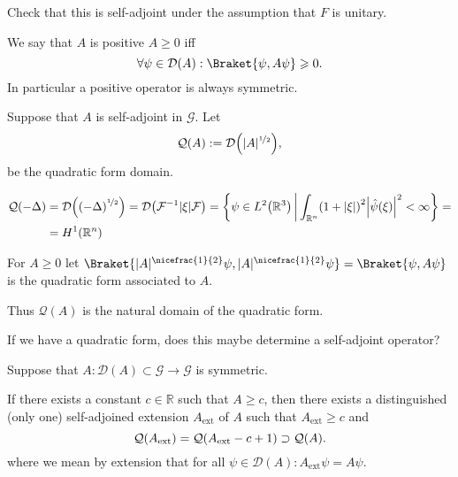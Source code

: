 \documentclass[12pt]{article}
\numberwithin{equation}{section}
\theoremstyle{plain}
\theoremstyle{plain}
\begin{document}
Check that this is self-adjoint under the assumption that $F$ is unitary.

\begin{defn}[Positivity]
	We say that $A$ is positive $A \geqslant 0$ iff
	\[
		\forall \psi \in \mathcal D(A) : \Braket{\psi, A \psi} \geqslant 0.	
	\] 
	In particular a positive operator is always symmetric.
\end{defn}


\begin{defn}
	Suppose that $A$ is self-adjoint in $\mathcal G$. Let 
	\[
		\mathcal Q(A) := \mathcal D \mleft( |A|^{\nicefrac{1}{2}} \mright),	
	\]
	be the quadratic form domain.
\end{defn}

\begin{example*}
	\begin{align*}
		\mathcal Q (-\Delta) &= \mathcal D \mleft( \mleft(-\Delta \mright)^{\nicefrac{1}{2}} \mright) = \mathcal D \mleft( \mathcal F^{-1} |\xi| \mathcal F \mright) = \mleft\{ \psi \in L^2 \mleft(\mathbb{R}^3 \mright) \, \middle| \, \int_{\mathbb{R}^n} \mleft(1+|\xi|\mright)^2 \mleft| \hat\psi (\xi) \mright|^2 < \infty \mright\} =	\\&= H^1 \mleft( \mathbb{R}^n \mright)
	\end{align*}
\end{example*}

\begin{defn}

	For $A \geqslant 0$ let $\Braket{|A|^{\nicefrac{1}{2}}\psi , |A|^{\nicefrac{1}{2}} \psi} = \Braket{\psi,A\psi}$ is the quadratic form associated to $A$.
	
	Thus $\mathcal Q(A)$ is the natural domain of the quadratic form.

\end{defn}

\begin{remark}[Question]

If we have a quadratic form, does this maybe determine a self-adjoint operator?

\end{remark}

\begin{theorem}[Friederichs]
	Suppose that $A: \mathcal D(A) \subset \mathcal G \rightarrow  \mathcal G$ is symmetric.
	
	If there exists a constant $c \in \mathbb{R}$ such that $A \geqslant c$, then there exists a distinguished (only one) self-adjoined extension $A_{\text{ext}}$ of $A$ such that $A_{\text{ext}} \geqslant c$ and
	\[
		\mathcal Q(A_{\text{ext}})=\mathcal  Q \mleft( A_{\text{ext}} - c +1 \mright) \supset \mathcal Q(A).	
	\]
	where we mean by extension that for all $\psi \in \mathcal D(A): A_{\text{ext}} \psi = A \psi$. 
\end{theorem}
\end{document}
